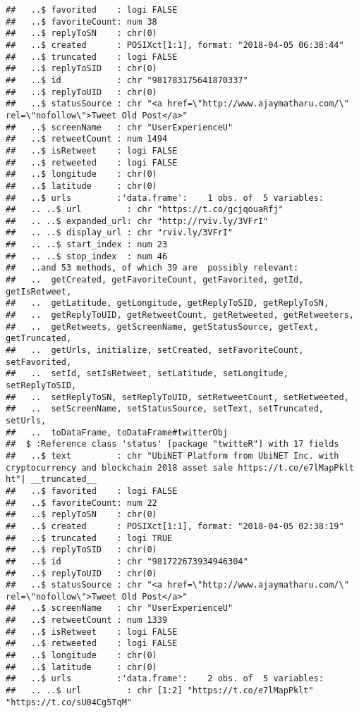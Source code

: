 \documentclass[]{article}
\begin{document}
\begin{verbatim}
##   ..$ favorited    : logi FALSE
##   ..$ favoriteCount: num 38
##   ..$ replyToSN    : chr(0) 
##   ..$ created      : POSIXct[1:1], format: "2018-04-05 06:38:44"
##   ..$ truncated    : logi FALSE
##   ..$ replyToSID   : chr(0) 
##   ..$ id           : chr "981783175641870337"
##   ..$ replyToUID   : chr(0) 
##   ..$ statusSource : chr "<a href=\"http://www.ajaymatharu.com/\" rel=\"nofollow\">Tweet Old Post</a>"
##   ..$ screenName   : chr "UserExperienceU"
##   ..$ retweetCount : num 1494
##   ..$ isRetweet    : logi FALSE
##   ..$ retweeted    : logi FALSE
##   ..$ longitude    : chr(0) 
##   ..$ latitude     : chr(0) 
##   ..$ urls         :'data.frame':    1 obs. of  5 variables:
##   .. ..$ url         : chr "https://t.co/gcjqouaRfj"
##   .. ..$ expanded_url: chr "http://rviv.ly/3VFrI"
##   .. ..$ display_url : chr "rviv.ly/3VFrI"
##   .. ..$ start_index : num 23
##   .. ..$ stop_index  : num 46
##   ..and 53 methods, of which 39 are  possibly relevant:
##   ..  getCreated, getFavoriteCount, getFavorited, getId, getIsRetweet,
##   ..  getLatitude, getLongitude, getReplyToSID, getReplyToSN,
##   ..  getReplyToUID, getRetweetCount, getRetweeted, getRetweeters,
##   ..  getRetweets, getScreenName, getStatusSource, getText, getTruncated,
##   ..  getUrls, initialize, setCreated, setFavoriteCount, setFavorited,
##   ..  setId, setIsRetweet, setLatitude, setLongitude, setReplyToSID,
##   ..  setReplyToSN, setReplyToUID, setRetweetCount, setRetweeted,
##   ..  setScreenName, setStatusSource, setText, setTruncated, setUrls,
##   ..  toDataFrame, toDataFrame#twitterObj
##  $ :Reference class 'status' [package "twitteR"] with 17 fields
##   ..$ text         : chr "UbiNET Platform from UbiNET Inc. with cryptocurrency and blockchain 2018 asset sale https://t.co/e7lMapPklt ht"| __truncated__
##   ..$ favorited    : logi FALSE
##   ..$ favoriteCount: num 22
##   ..$ replyToSN    : chr(0) 
##   ..$ created      : POSIXct[1:1], format: "2018-04-05 02:38:19"
##   ..$ truncated    : logi TRUE
##   ..$ replyToSID   : chr(0) 
##   ..$ id           : chr "981722673934946304"
##   ..$ replyToUID   : chr(0) 
##   ..$ statusSource : chr "<a href=\"http://www.ajaymatharu.com/\" rel=\"nofollow\">Tweet Old Post</a>"
##   ..$ screenName   : chr "UserExperienceU"
##   ..$ retweetCount : num 1339
##   ..$ isRetweet    : logi FALSE
##   ..$ retweeted    : logi FALSE
##   ..$ longitude    : chr(0) 
##   ..$ latitude     : chr(0) 
##   ..$ urls         :'data.frame':    2 obs. of  5 variables:
##   .. ..$ url         : chr [1:2] "https://t.co/e7lMapPklt" "https://t.co/sU04Cg5TqM"

\end{verbatim}
\end{document}
